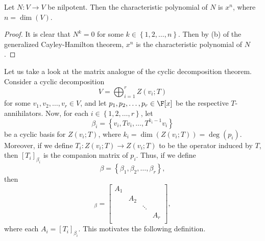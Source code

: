 \documentclass[linearalgebraII]{subfiles}
\begin{document}
    \begin{cor}{}
        Let $N:V\to V$ be nilpotent. Then the characteristic polynomial of $N$ is $x^n$, where $n=\dim(V)$.
    \end{cor}	

    \begin{proof}
        It is clear that $N^k=0$ for some $k\in\left\lbrace 1,2,\ldots,n \right\rbrace $. Then by (b) of the generalized Cayley-Hamilton theorem, $x^n$ is the characteristic polynomial of $N$.
    \end{proof}
    
    \begin{remark}
        Let us take a look at the matrix analogue of the cyclic decomposition theorem. Consider a cyclic decomposition
        \begin{equation*}
            V = \bigoplus^{r}_{i=1} Z\left( v_i;T \right) 
        \end{equation*}
        for some $v_1,v_2,\ldots,v_r\in V$, and let $p_1,p_2,\ldots,p_r\in\F[x]$ be the respective $T$-annihilators. Now, for each $i\in \left\lbrace 1,2,\ldots,r \right\rbrace $, let
        \begin{equation*}
            \beta_i = \left\lbrace v_i, Tv_i, \ldots, T^{k_i-1}v_i \right\rbrace 
        \end{equation*}
        be a cyclic basis for $Z\left( v_i;T \right)$, where $k_i=\dim\left( Z\left( v_i;T \right)  \right) = \deg\left( p_i \right)$. Moreover, if we define $T_i:Z\left( v_i;T \right) \to Z\left( v_i;T \right)$ to be the operator induced by $T$, then $\left[ T_i \right] _{\beta_i}$ is the companion matrix of $p_i$. Thus, if we define
        \begin{equation*}
            \beta = \left\lbrace \beta_1,\beta_2, \ldots,\beta_r \right\rbrace ,
        \end{equation*}
        then
        \begin{equation*}
            [T]_\beta = 
            \begin{bmatrix}
                A_1 & & & \\
                & A_2 & & \\
                & & \ddots & \\
                & & & A_r\\
            \end{bmatrix},
        \end{equation*}
        where each $A_i = \left[ T_i \right] _{\beta_i}$. This motivates the following definition.
    \end{remark}
\end{document}
